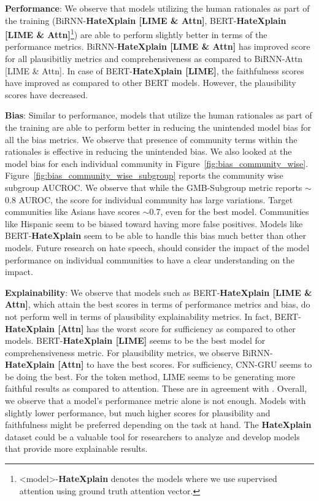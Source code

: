 \documentclass[letterpaper]{article} \usepackage{aaai21}  \usepackage{times}  \usepackage{helvet} \usepackage{courier}  \usepackage[hyphens]{url}  \usepackage{graphicx} \urlstyle{rm} \def\UrlFont{\rm}  \usepackage{natbib}  \usepackage{caption}
\begin{document}
\noindent\textbf{Performance}: We observe that models  utilizing the human rationales as part of the training (BiRNN-{\bf{HateXplain} [LIME \& Attn]}, BERT-{\bf{HateXplain} [LIME \& Attn]}\footnote{\textless model\textgreater-{\bf{HateXplain}} denotes the models where we use supervised attention using ground truth attention vector.}) are able to perform slightly better in terms of the performance metrics. 
BiRNN-{\bf{HateXplain} [LIME \& Attn]} has improved score for all plausibitliy metrics and comprehensiveness as compared to BiRNN-Attn [LIME \& Attn]. In case of BERT-{\bf{HateXplain} [LIME]}, the faithfulness scores have improved as compared to other BERT models. However, the plausibility scores have decreased.



\noindent\textbf{Bias}: Similar to performance, models that utilize the human rationales as part of the training are able to perform better in reducing the unintended model bias for all the bias metrics. We observe that presence of community terms within the rationales is effective in reducing the unintended bias.
We also looked at the model bias for each individual community in Figure~\ref{fig:bias_community_wise}. 
Figure~\ref{fig:bias_community_wise_subgroup} reports the community wise subgroup AUCROC. We observe that while the GMB-Subgroup metric reports $\sim$0.8 AUROC, the score for individual community has large variations. Target communities like Asians have scores $\sim$0.7, even for the best model. Communities like Hispanic seem to be biased toward having more false positives. Models like BERT-\textbf{HateXplain} seem to be able to handle this bias much better than other models. Future research on hate speech, should consider the impact of the model performance on individual communities to have a clear understanding on the impact.




\noindent\textbf{Explainability}: We observe that models such as BERT-{\bf{HateXplain} [LIME \& Attn]}, which attain the best scores in terms of performance metrics and bias, do not perform well in terms of plausibility explainability metrics. In fact, BERT-{\bf{HateXplain} [Attn]} has the worst score for sufficiency as compared to other models. BERT-{\bf{HateXplain} [LIME]} seems to be the best model for comprehensiveness metric. 
For plausibility metrics, we observe BiRNN-{\bf{HateXplain} [Attn]} to have the best scores. For sufficiency, CNN-GRU seems to be doing the best. For the token method, LIME seems to be generating more faithful results as compared to attention. These are in agreement with \citet{deyoung2019eraser}. Overall, we observe that a model's performance metric alone is not enough. Models with slightly lower performance, but much higher scores for plausibility and faithfulness might be preferred depending on the task at hand. The \textbf{HateXplain} dataset could be a valuable tool for researchers to analyze and develop models that provide more explainable results. 
\end{document}
